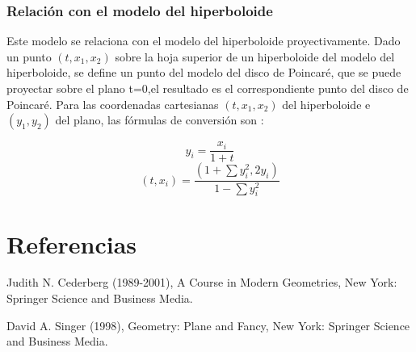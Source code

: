 \documentclass{article}
\theoremstyle{plain}
\theoremstyle{definition}
\theoremstyle{remark}
\begin{document}
\subsubsection{Relación con el modelo del hiperboloide}
Este modelo se relaciona con el modelo del hiperboloide
proyectivamente. Dado un punto $(t, x_1,x_2)$ sobre la hoja superior
de un hiperboloide del modelo del hiperboloide, se define un punto del
modelo del disco de Poincaré, que se puede proyectar sobre el plano
t=0,el resultado es el correspondiente punto del disco de Poincaré.
Para las coordenadas cartesianas $(t,x_1,x_2)$ del hiperboloide e
$(y_1,y_2)$ del plano, las fórmulas de conversión son :

$$y_{i}=\frac {x_{i}}{1+t}$$
$$(t,x_{i})=\frac {(1+\sum {y_{i}^{2}},2y_{i})}{1-\sum {y_{i}^{2}}}$$


\section{Referencias}
\begin{thebibliography}{9}

  Judith N. Cederberg (1989-2001),
  A Course in Modern Geometries,
  New York: Springer Science and Business Media.

  David A. Singer (1998),
  Geometry: Plane and Fancy,
  New York: Springer Science and Business Media.
  
\end{thebibliography}
\end{document}
